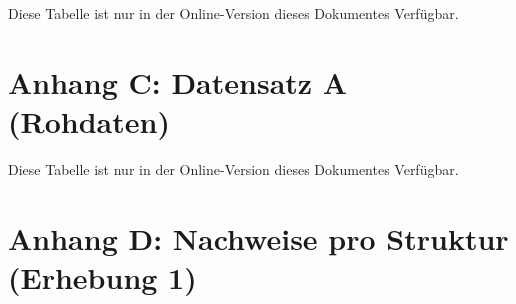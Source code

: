 \documentclass[
  oneside]{scrbook}
\begin{document}
Diese Tabelle ist nur in der Online-Version dieses Dokumentes Verfügbar.

\hypertarget{anhang-datensatz-a}{%
\section{Anhang C: Datensatz A (Rohdaten)}\label{anhang-datensatz-a}}

Diese Tabelle ist nur in der Online-Version dieses Dokumentes Verfügbar.

\hypertarget{anhang-d-nachweise-pro-struktur-erhebung-1}{%
\section{Anhang D: Nachweise pro Struktur (Erhebung 1)}\label{anhang-d-nachweise-pro-struktur-erhebung-1}}
\end{document}
